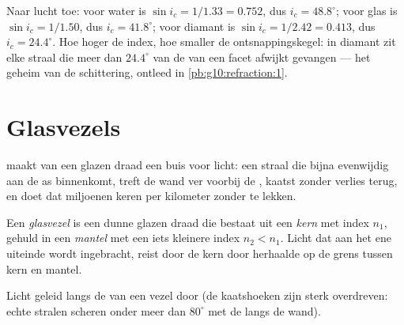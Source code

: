 \begin{example}\label{ex:g10:refraction:criticalvalues}
Naar lucht toe: voor water is $\sin i_c = 1/1.33 = 0.752$, dus
$i_c = 48.8^\circ$; voor glas is $\sin i_c = 1/1.50$, dus
$i_c = 41.8^\circ$; voor diamant is $\sin i_c = 1/2.42 = 0.413$, dus
$i_c = 24.4^\circ$. Hoe hoger de index, hoe smaller de ontsnappingskegel:
in diamant zit elke straal die meer dan $24.4^\circ$ van de  van
een facet afwijkt gevangen --- het geheim van de schittering, ontleed in
\cref{pb:g10:refraction:1}.
\end{example}

\section{Glasvezels}

 maakt van een glazen draad een buis voor licht: een
straal die bijna evenwijdig aan de as binnenkomt, treft de wand ver
voorbij de , kaatst zonder verlies terug, en doet dat miljoenen
keren per kilometer zonder te lekken.

\begin{definition}[Glasvezel]\label{def:g10:refraction:fiber}
Een \emph{glasvezel} is een dunne glazen draad die
bestaat uit een \emph{kern} met index $n_1$, gehuld in een
\emph{mantel} met een iets kleinere index $n_2 < n_1$.
Licht dat aan het ene uiteinde wordt ingebracht, reist door de kern door
herhaalde  op de grens tussen kern en mantel.
\end{definition}

\begin{omfigure}

{\small Licht geleid langs de  van een vezel door  (de kaatshoeken zijn sterk overdreven: echte stralen
scheren onder meer dan $80^\circ$ met de  langs de wand).}
\end{omfigure}

